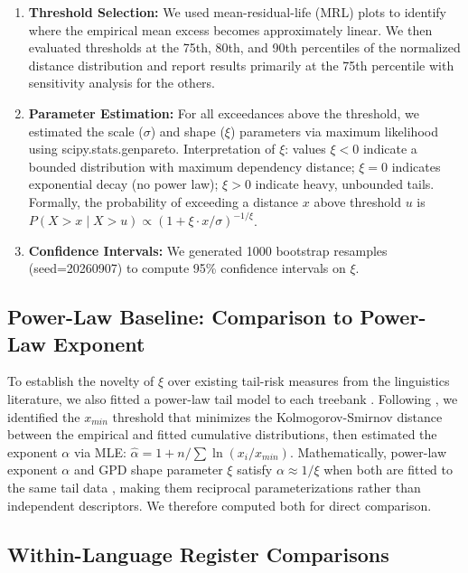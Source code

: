 \documentclass[11pt,letterpaper]{article}
\begin{document}
\begin{enumerate}
\item \textbf{Threshold Selection:} We used mean-residual-life (MRL) plots to identify where the empirical mean excess becomes approximately linear. We then evaluated thresholds at the 75th, 80th, and 90th percentiles of the normalized distance distribution and report results primarily at the 75th percentile with sensitivity analysis for the others.
\item \textbf{Parameter Estimation:} For all exceedances above the threshold, we estimated the scale ($\sigma$) and shape ($\xi$) parameters via maximum likelihood using scipy.stats.genpareto. Interpretation of $\xi$: values $\xi<0$ indicate a bounded distribution with maximum dependency distance; $\xi=0$ indicates exponential decay (no power law); $\xi>0$ indicate heavy, unbounded tails. Formally, the probability of exceeding a distance $x$ above threshold $u$ is $P(X>x \mid X>u) \propto (1+\xi \cdot x/\sigma)^{-1/\xi}$.
\item \textbf{Confidence Intervals:} We generated 1000 bootstrap resamples (seed=20260907) to compute 95\% confidence intervals on $\xi$.
\end{enumerate}

\subsection{Power-Law Baseline: Comparison to Power-Law Exponent}

To establish the novelty of $\xi$ over existing tail-risk measures from the linguistics literature, we also fitted a power-law tail model to each treebank \citep{Petrini2025}. Following \citet{Clauset2009}, we identified the $x_{min}$ threshold that minimizes the Kolmogorov-Smirnov distance between the empirical and fitted cumulative distributions, then estimated the exponent $\alpha$ via MLE: $\hat{\alpha} = 1 + n / \sum \ln(x_i / x_{min})$. Mathematically, power-law exponent $\alpha$ and GPD shape parameter $\xi$ satisfy $\alpha \approx 1/\xi$ when both are fitted to the same tail data \citep{Clauset2009,Beirlant2004}, making them reciprocal parameterizations rather than independent descriptors. We therefore computed both for direct comparison.

\subsection{Within-Language Register Comparisons}
\end{document}
